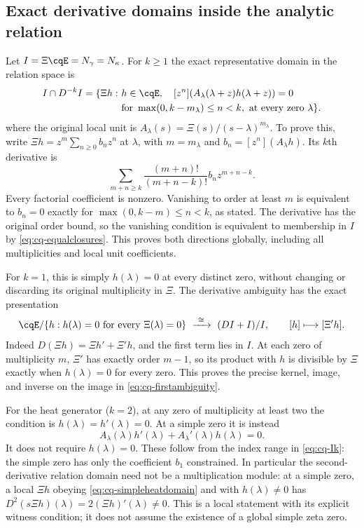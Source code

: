\subsection{Exact derivative domains inside the analytic relation}
Let $I=\Xi\cqE=N_\gamma=N_\kappa$. For $k\geq1$ the exact
representative domain in the relation space is
\begin{equation}\label{eq:cq-Ik}
 \begin{aligned}
 I\cap D^{-k}I=\{\Xi h:\ &h\in\cqE,\quad
 [z^n](A_\lambda(\lambda+z)h(\lambda+z))=0\\
 &\text{for }\max(0,k-m_\lambda)\leq n<k,
                   \text{ at every zero }\lambda\}.
 \end{aligned}
\end{equation}
where the original local unit is
$A_\lambda(s)=\Xi(s)/(s-\lambda)^{m_\lambda}$.
To prove this, write $\Xi h=z^m\sum_{n\geq0}b_nz^n$ at
$\lambda$, with $m=m_\lambda$ and
$b_n=[z^n](A_\lambda h)$. Its $k$th derivative is
\[
 \sum_{m+n\geq k}\frac{(m+n)!}{(m+n-k)!}
               b_nz^{m+n-k}.
\]
Every factorial coefficient is nonzero. Vanishing to order at least
$m$ is equivalent to $b_n=0$ exactly for
$\max(0,k-m)\leq n<k$, as stated. The derivative has the original
order bound, so the vanishing condition is equivalent to membership
in $I$ by \eqref{eq:cq-equalclosures}. This proves both directions
globally, including all multiplicities and local unit coefficients.

For $k=1$, this is simply $h(\lambda)=0$ at every distinct zero,
without changing or discarding its original multiplicity in $\Xi$.
The derivative ambiguity has the exact presentation
\begin{equation}\label{eq:cq-firstambiguity}
 \cqE/\{h:h(\lambda)=0\text{ for every }\Xi(\lambda)=0\}
 \ \xrightarrow{\ \cong\ }\ (DI+I)/I,
 \qquad [h]\longmapsto[\Xi'h].
\end{equation}
Indeed $D(\Xi h)=\Xi h'+\Xi'h$, and the first term lies in $I$.
At each zero of multiplicity $m$, $\Xi'$ has exactly order $m-1$,
so its product with $h$ is divisible by $\Xi$ exactly when
$h(\lambda)=0$ for every zero. This proves the precise kernel,
image, and inverse on the image in \eqref{eq:cq-firstambiguity}.

For the heat generator ($k=2$), at any zero of multiplicity at least
two the condition is $h(\lambda)=h'(\lambda)=0$.
At a simple zero it is instead
\begin{equation}\label{eq:cq-simpleheatdomain}
 A_\lambda(\lambda)h'(\lambda)
        +A_\lambda'(\lambda)h(\lambda)=0.
\end{equation}
It does not require $h(\lambda)=0$. These follow from the index
range in \eqref{eq:cq-Ik}: the simple zero has only the coefficient
$b_1$ constrained. In particular the second-derivative relation
domain need not be a multiplication module: at a simple zero, a
local $\Xi h$ obeying \eqref{eq:cq-simpleheatdomain} and with
$h(\lambda)\ne0$ has
$D^2(s\Xi h)(\lambda)=2(\Xi h)'(\lambda)\ne0$.
This is a local statement with its explicit witness condition; it
does not assume the existence of a global simple zeta zero.

